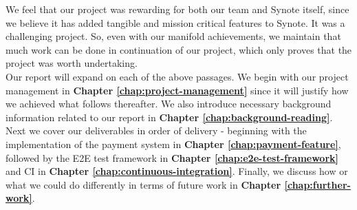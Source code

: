 We feel that our project was rewarding for both our team and Synote itself, since we believe it has added tangible and mission critical features to Synote. It was a challenging project. So, even with our manifold achievements, we maintain that much work can be done in continuation of our project, which only proves that the project was worth undertaking.\\

Our report will expand on each of the above passages. We begin with our project management in \textbf{Chapter \ref{chap:project-management}} since it will justify how we achieved what follows thereafter. We also introduce necessary background information related to our report in \textbf{Chapter \ref{chap:background-reading}}. Next we cover our deliverables in order of delivery - beginning with the implementation of the payment system in \textbf{Chapter \ref{chap:payment-feature}}, followed by the E2E test framework in \textbf{Chapter \ref{chap:e2e-test-framework}} and CI in \textbf{Chapter \ref{chap:continuous-integration}}. Finally, we discuss how or what we could do differently in terms of future work in \textbf{Chapter \ref{chap:further-work}}.
